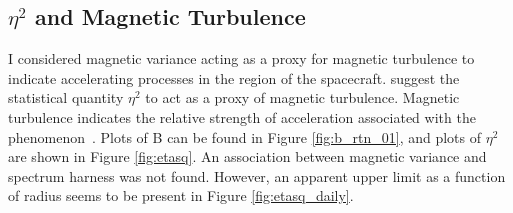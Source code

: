 \documentclass[letterpaper,11pt]{article}
\begin{document}
\subsection{$\eta^2$ and Magnetic Turbulence}
I considered magnetic variance acting as a proxy for magnetic turbulence to indicate accelerating processes in the region of the spacecraft.  \citet{Schwadron1996} suggest the statistical quantity $\eta^2$ to act as a proxy of magnetic turbulence.  Magnetic turbulence indicates the relative strength of acceleration associated with the phenomenon~\citep{Fisk2006}.  Plots of B can be found in Figure \ref{fig:b_rtn_01}, and plots of $\eta^2$ are shown in Figure \ref{fig:etasq}.  An association between magnetic variance and spectrum harness was not found.  However, an apparent upper limit as a function of radius seems to be present in Figure \ref{fig:etasq_daily}.
\end{document}
